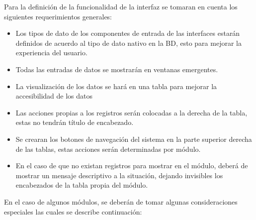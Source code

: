 		Para la definici\'on de la funcionalidad de la interfaz se tomaran en cuenta los siguientes requerimientos generales:
		\begin{itemize}
			\item Los tipos de dato de los componentes de entrada de las interfaces estar\'an definidos de acuerdo al tipo de dato nativo en la BD, esto para mejorar la experiencia del usuario.
			\item Todas las entradas de datos se mostrar\'an en ventanas emergentes.
			\item La visualizaci\'on de los datos se har\'a en una tabla para mejorar la accesibilidad de los datos
			\item Las acciones propias a los registros ser\'an colocadas a la derecha de la tabla, estas no tendr\'an t\'itulo de encabezado.
			\item Se crearan los botones de navegaci\'on del sistema en la parte superior derecha de las tablas, estas acciones ser\'an determinadas por m\'odulo.
			\item En el caso de que no existan registros para mostrar en el m\'odulo, deber\'a de mostrar un mensaje descriptivo a la situaci\'on, dejando invisibles los encabezados de la tabla propia del m\'odulo.
		\end{itemize}

		En el caso de algunos m\'odulos, se deber\'an de tomar algunas consideraciones especiales las cuales se describe continuaci\'on:

